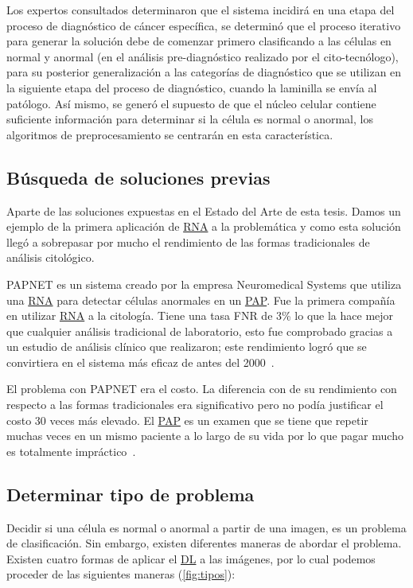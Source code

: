 Los expertos consultados determinaron que el sistema incidirá en una etapa del
proceso de diagnóstico de cáncer específica, se determinó que el proceso
iterativo para generar la solución debe de comenzar primero clasificando a las
células en normal y anormal (en el análisis pre-diagnóstico realizado por el
cito-tecnólogo), para su posterior generalización a las categorías de
diagnóstico que se utilizan en la siguiente etapa del proceso de diagnóstico,
cuando la laminilla se envía al patólogo. Así mismo, se generó el supuesto de
que el núcleo celular contiene suficiente información para determinar si la
célula es normal o anormal, los algoritmos de preprocesamiento se centrarán en
esta característica.

\subsection{Búsqueda de soluciones previas}

Aparte de las soluciones expuestas en el Estado del Arte de esta tesis. Damos un
ejemplo de la primera aplicación de \hyperlink{abbr}{RNA} a la problemática y
como esta solución llegó a sobrepasar por mucho el rendimiento de las formas
tradicionales de análisis citológico. 

PAPNET es un sistema creado por la empresa Neuromedical Systems que utiliza una
\hyperlink{abbr}{RNA} para detectar células anormales en un
\hyperlink{abbr}{PAP}. Fue la primera compañía en utilizar \hyperlink{abbr}{RNA}
a la citología. Tiene una tasa FNR de 3\% lo que la hace mejor que cualquier
análisis tradicional de laboratorio, esto fue comprobado gracias a un estudio de
análisis clínico que realizaron; este rendimiento logró que se convirtiera en el
sistema más eficaz de antes del 2000~\cite{DeCresce1991}.

El problema con PAPNET era el costo. La diferencia con de su rendimiento con
respecto a las formas tradicionales era significativo pero no podía justificar
el costo 30 veces más elevado. El \hyperlink{abbr}{PAP} es un examen que se
tiene que repetir muchas veces en un mismo paciente a lo largo de su vida por lo
que pagar mucho es totalmente impráctico~\cite{Media}. 

\subsection{Determinar tipo de problema}

Decidir si una célula es normal o anormal a partir de una imagen, es un problema
de clasificación. Sin embargo, existen diferentes maneras de abordar el
problema. Existen cuatro formas de aplicar el \hyperlink{abbr}{DL} a las
imágenes, por lo cual podemos proceder de las siguientes maneras (\autoref{fig:tipos}):

